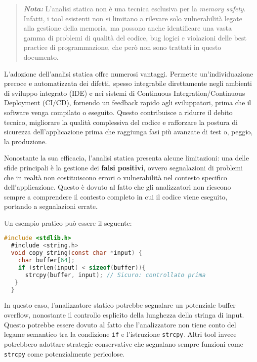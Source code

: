 \begin{quote}
  \textbf{\textit{Nota:}} L'analisi statica non è una tecnica esclusiva per la
  \textit{memory safety}. Infatti, i tool esistenti non si limitano a rilevare solo
  vulnerabilità legate alla gestione della memoria, ma possono anche
  identificare una vasta gamma di problemi di qualità del codice, bug logici e violazioni
  delle best practice di programmazione, che però non sono trattati in questo
  documento.
\end{quote}

\noindent
L'adozione dell'analisi statica offre numerosi vantaggi. Permette un'individuazione
precoce e automatizzata dei difetti, spesso integrabile direttamente negli ambienti
di sviluppo integrato (IDE) e nei sistemi di Continuous Integration/Continuous Deployment
(CI/CD), fornendo un feedback rapido agli sviluppatori, prima che il software venga
compilato o eseguito. Questo contribuisce a ridurre il debito tecnico, migliorare
la qualità complessiva del codice e rafforzare la postura di sicurezza dell'applicazione
prima che raggiunga fasi più avanzate di test o, peggio, la produzione.

Nonostante la sua efficacia, l'analisi statica presenta alcune limitazioni: una delle
sfide principali è la gestione dei \textbf{falsi positivi}, ovvero segnalazioni di
problemi che in realtà non costituiscono errori o vulnerabilità nel contesto specifico
dell'applicazione. Questo è dovuto al fatto che gli analizzatori non riescono
sempre a comprendere il contesto completo in cui il codice viene eseguito, portando
a segnalazioni errate.

Un esempio pratico può essere il seguente:

\begin{lstlisting}[language=C]
  #include <stdlib.h>
  #include <string.h>
  void copy_string(const char *input) {
    char buffer[64];
    if (strlen(input) < sizeof(buffer)){
      strcpy(buffer, input); // Sicuro: controllato prima
   }
  }
\end{lstlisting}

In questo caso, l'analizzatore statico potrebbe segnalare un potenziale buffer overflow,
nonostante il controllo esplicito della lunghezza della stringa di input. Questo
potrebbe essere dovuto al fatto che l'analizzatore non tiene conto del legame semantico
tra la condizione \texttt{if} e l'istruzione \texttt{strcpy}. Altri tool invece
potrebbero adottare strategie conservative che segnalano sempre funzioni come
\texttt{strcpy} come potenzialmente pericolose.

